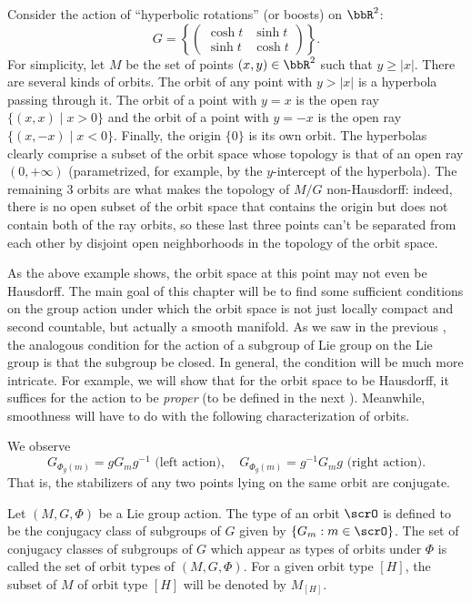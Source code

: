 \begin{example}
    Consider the action of ``hyperbolic rotations'' (or boosts) on $\bbR^2$:
    \[G=\left\{\begin{pmatrix}
    \cosh t & \sinh t\\
    \sinh t & \cosh t
    \end{pmatrix}\right\}.\]
    For simplicity, let $M$ be the set of points $(x,y)\in\bbR^2$ such that $y\geq |x|$. There are several kinds of orbits. The orbit of any point with $y>|x|$ is a hyperbola passing through it. The orbit of a point with $y=x$  is the open ray $\{(x,x)\mid x>0\}$ and the orbit of a point with $y=-x$ is the open ray $\{(x,-x)\mid x<0\}$. Finally, the origin $\{0\}$ is its own orbit. The hyperbolas clearly comprise a subset of the orbit space whose topology is that of an open ray $(0,+\infty)$ (parametrized, for example, by the $y$-intercept of the hyperbola). The remaining $3$ orbits are what makes the topology of $M\slash G$ non-Hausdorff: indeed, there is no open subset of the orbit space that contains the origin but does not contain both of the ray orbits, so these last three points can't be separated from each other by disjoint open neighborhoods in the topology of the orbit space.
\end{example}

As the above example shows, the orbit space at this point may not even be Hausdorff. The main goal of this chapter will be to find some sufficient conditions on the group action under which the orbit space is not just locally compact and second countable, but actually a smooth manifold. As we saw in the previous \chap, the analogous condition for the action of a subgroup of Lie group on the Lie group is that the subgroup be closed. In general, the condition will be much more intricate. For example, we will show that for the orbit space to be Hausdorff, it suffices for the action to be \emph{proper} (to be defined in the next \sect). Meanwhile, smoothness will have to do with the following characterization of orbits.

We observe
\[G_{\Phi_g(m)}=gG_mg^{-1}\text{ (left action)}, \quad G_{\Phi_g(m)}=g^{-1}G_mg\text{ (right action)}.\]
That is, the stabilizers of any two points lying on the same orbit are conjugate.


\begin{defn}
    Let $(M,G,\Phi)$ be a Lie group action. The type of an orbit $\scrO$ is defined to be the conjugacy class of subgroups of $G$ given by $\{G_m:m\in \scrO\}$. The set of conjugacy classes of subgroups of $G$ which appear as types of orbits under $\Phi$ is called the set of orbit types of $(M,G,\Phi)$. For a given orbit type $[H]$, the subset of $M$ of orbit type $[H]$ will be denoted by $M_{[H]}$.
\end{defn}

